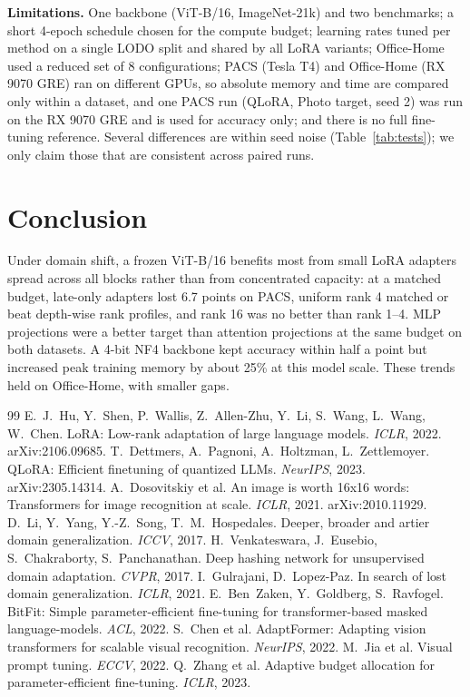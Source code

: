 \documentclass[10pt,twocolumn]{article}
\begin{document}
\textbf{Limitations.} One backbone (ViT-B/16, ImageNet-21k) and two benchmarks; a short 4-epoch schedule chosen for
the compute budget; learning rates tuned per method on a single LODO split and shared by all LoRA variants;
Office-Home used a reduced set of 8 configurations; PACS (Tesla T4) and Office-Home (RX 9070 GRE) ran on different
GPUs, so absolute memory and time are compared only within a dataset, and one PACS run (QLoRA, Photo target,
seed 2) was run on the RX 9070 GRE and is used for accuracy only; and there is no full fine-tuning reference.
Several differences are within seed noise (Table~\ref{tab:tests}); we only claim those that are consistent across
paired runs.

\section{Conclusion}
Under domain shift, a frozen ViT-B/16 benefits most from small LoRA adapters spread across all blocks rather than
from concentrated capacity: at a matched budget, late-only adapters lost 6.7 points on PACS, uniform rank 4 matched
or beat depth-wise rank profiles, and rank 16 was no better than rank 1--4. MLP projections were a better target
than attention projections at the same budget on both datasets. A 4-bit NF4 backbone kept accuracy within half a
point but increased peak training memory by about 25\% at this model scale. These trends held on Office-Home, with
smaller gaps.

\begin{thebibliography}{99}\small
{} E.~J.~Hu, Y.~Shen, P.~Wallis, Z.~Allen-Zhu, Y.~Li, S.~Wang, L.~Wang, W.~Chen.
LoRA: Low-rank adaptation of large language models. \emph{ICLR}, 2022. arXiv:2106.09685.
 T.~Dettmers, A.~Pagnoni, A.~Holtzman, L.~Zettlemoyer.
QLoRA: Efficient finetuning of quantized LLMs. \emph{NeurIPS}, 2023. arXiv:2305.14314.
 A.~Dosovitskiy et al. An image is worth 16x16 words: Transformers for image
recognition at scale. \emph{ICLR}, 2021. arXiv:2010.11929.
 D.~Li, Y.~Yang, Y.-Z.~Song, T.~M.~Hospedales. Deeper, broader and artier domain
generalization. \emph{ICCV}, 2017.
 H.~Venkateswara, J.~Eusebio, S.~Chakraborty, S.~Panchanathan. Deep hashing
network for unsupervised domain adaptation. \emph{CVPR}, 2017.
 I.~Gulrajani, D.~Lopez-Paz. In search of lost domain generalization.
\emph{ICLR}, 2021.
 E.~Ben~Zaken, Y.~Goldberg, S.~Ravfogel. BitFit: Simple parameter-efficient fine-tuning
for transformer-based masked language-models. \emph{ACL}, 2022.
 S.~Chen et al. AdaptFormer: Adapting vision transformers for scalable visual
recognition. \emph{NeurIPS}, 2022.
 M.~Jia et al. Visual prompt tuning. \emph{ECCV}, 2022.
 Q.~Zhang et al. Adaptive budget allocation for parameter-efficient fine-tuning.
\emph{ICLR}, 2023.
\end{thebibliography}
\end{document}
